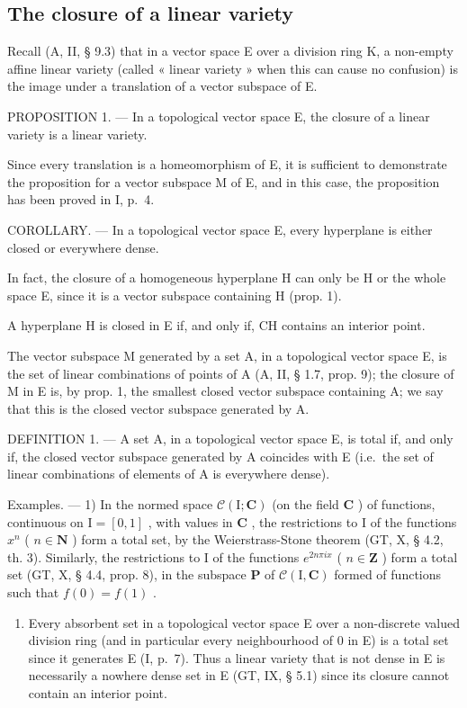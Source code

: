 \subsection{The closure of a linear variety}

Recall (A, II, § 9.3) that in a vector space E over a division ring K, a non-empty affine linear variety (called « linear variety » when this can cause no confusion) is the image under a translation of a vector subspace of E.

PROPOSITION 1. --- In a topological vector space E, the closure of a linear variety is a linear variety.

Since every translation is a homeomorphism of E, it is sufficient to demonstrate the proposition for a vector subspace M of E, and in this case, the proposition has been proved in I, p.~4.

COROLLARY. --- In a topological vector space E, every hyperplane is either closed or everywhere dense.

In fact, the closure of a homogeneous hyperplane H can only be H or the whole space E, since it is a vector subspace containing H (prop. 1).

A hyperplane H is closed in E if, and only if, CH contains an interior point.

The vector subspace M generated by a set A, in a topological vector space E, is the set of linear combinations of points of A (A, II, § 1.7, prop. 9); the closure of M in E is, by prop. 1, the smallest closed vector subspace containing A; we say that this is the closed vector subspace generated by A.

DEFINITION 1. --- A set A, in a topological vector space E, is total if, and only if, the closed vector subspace generated by A coincides with E (i.e.~the set of linear combinations of elements of A is everywhere dense).

Examples. --- 1) In the normed space \(\mathcal{C}(\mathrm{I};\mathbf{C})\) (on the field \(\mathbf{C}\) ) of functions, continuous on \(\mathrm{I} = [0,1]\) , with values in \(\mathbf{C}\) , the restrictions to \(\mathrm{I}\) of the functions \(x^n\) ( \(n\in \mathbf{N}\) ) form a total set, by the Weierstrass-Stone theorem (GT, X, § 4.2, th. 3). Similarly, the restrictions to \(\mathrm{I}\) of the functions \(e^{2n\pi ix}\) ( \(n\in \mathbf{Z}\) ) form a total set (GT, X, § 4.4, prop. 8), in the subspace \(\mathbf{P}\) of \(\mathcal{C}(\mathrm{I},\mathbf{C})\) formed of functions such that \(f(0) = f(1)\) .

\begin{enumerate}
\def\labelenumi{\arabic{enumi})}
\setcounter{enumi}{1}
\tightlist
\item
  Every absorbent set in a topological vector space E over a non-discrete valued division ring (and in particular every neighbourhood of 0 in E) is a total set since it generates E (I, p.~7). Thus a linear variety that is not dense in E is necessarily a nowhere dense set in E (GT, IX, § 5.1) since its closure cannot contain an interior point.
\end{enumerate}

